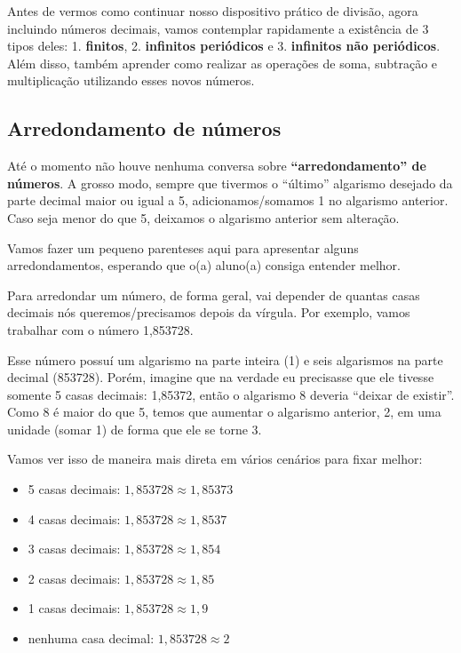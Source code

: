 Antes de vermos como continuar nosso dispositivo prático de divisão, agora incluindo números decimais, vamos contemplar rapidamente a existência de 3 tipos deles: 1. \textbf{finitos}, 2. \textbf{infinitos periódicos} e 3. \textbf{infinitos não periódicos}. Além disso, também aprender como realizar as operações de soma, subtração e multiplicação utilizando esses novos números.

\subsection{Arredondamento de números}

\begin{tcolorbox}[title=IMPORTANTE]
    Até o momento não houve nenhuma conversa sobre \textbf{``arredondamento'' de números}. A grosso modo, sempre que tivermos o ``último'' algarismo desejado da parte decimal maior ou igual a 5, adicionamos/somamos 1 no algarismo anterior. Caso seja menor do que 5, deixamos o algarismo anterior sem alteração.
\end{tcolorbox}

Vamos fazer um pequeno parenteses aqui para apresentar alguns arredondamentos, esperando que o(a) aluno(a) consiga entender melhor.

Para arredondar um número, de forma geral, vai depender de quantas casas decimais nós queremos/precisamos depois da vírgula. Por exemplo, vamos trabalhar com o número 1,853728.

Esse número possuí um algarismo na parte inteira (1) e seis algarismos na parte decimal (853728). Porém, imagine que na verdade eu precisasse que ele tivesse somente 5 casas decimais: 1,85372, então o algarismo 8 deveria ``deixar de existir''. Como 8 é maior do que 5, temos que aumentar o algarismo anterior, 2, em uma unidade (somar 1) de forma que ele se torne 3.

Vamos ver isso de maneira mais direta em vários cenários para fixar melhor:

\begin{itemize}
    \item 5 casas decimais: \(1,853728\approx1,85373\) 
    \item 4 casas decimais: \(1,853728\approx1,8537\) 
    \item 3 casas decimais: \(1,853728\approx1,854\) 
    \item 2 casas decimais: \(1,853728\approx1,85\) 
    \item 1 casas decimais: \(1,853728\approx1,9\) 
    \item nenhuma casa decimal: \(1,853728\approx2\) 
\end{itemize}

